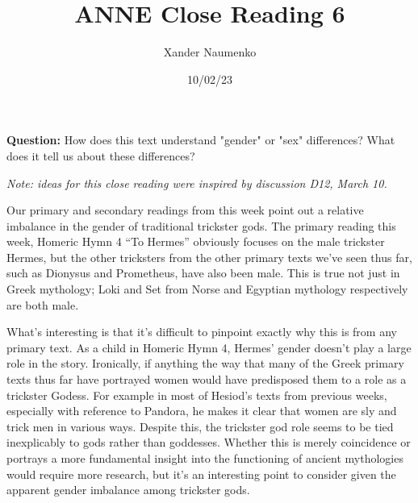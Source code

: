 \documentclass[letterpaper, reqno,11pt]{article}
\begin{document}
\title{ANNE Close Reading 6}
\date{10/02/23}
\author{Xander Naumenko}
\maketitle

{\bf Question:} How does this text understand "gender" or "sex" differences? What does it tell us about these differences? 

{\em Note: ideas for this close reading were inspired by discussion D12, March 10.}

Our primary and secondary readings from this week point out a relative imbalance in the gender of traditional trickster gods. The primary reading this week, Homeric Hymn 4 ``To Hermes'' obviously focuses on the male trickster Hermes, but the other tricksters from the other primary texts we've seen thus far, such as Dionysus and Prometheus, have also been male. This is true not just in Greek mythology; Loki and Set from Norse and Egyptian mythology respectively are both male. 

What's interesting is that it's difficult to pinpoint exactly why this is from any primary text. As a child in Homeric Hymn 4, Hermes' gender doesn't play a large role in the story. Ironically, if anything the way that many of the Greek primary texts thus far have portrayed women would have predisposed them to a role as a trickster Godess. For example in most of Hesiod's texts from previous weeks, especially with reference to Pandora, he makes it clear that women are sly and trick men in various ways. Despite this, the trickster god role seems to be tied inexplicably to gods rather than goddesses. Whether this is merely coincidence or portrays a more fundamental insight into the functioning of ancient mythologies would require more research, but it's an interesting point to consider given the apparent gender imbalance among trickster gods. 
\end{document}
